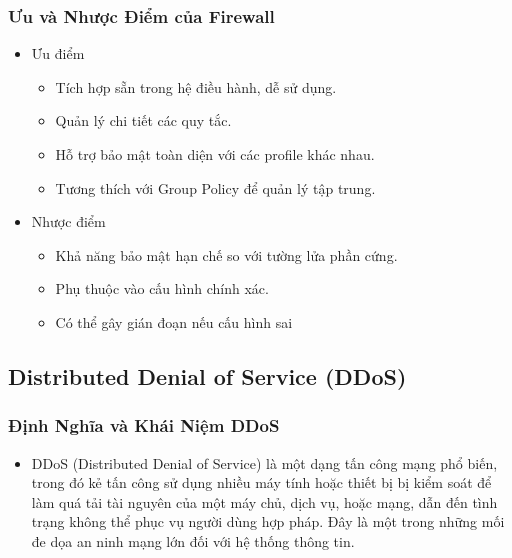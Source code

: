 \documentclass[13pt]{article}
\begin{document}
                \subsubsection{Ưu và Nhược Điểm của Firewall}
                \begin{itemize}
                    \item Ưu điểm
                    \begin{itemize}
                        \item Tích hợp sẵn trong hệ điều hành, dễ sử dụng.
                        \item Quản lý chi tiết các quy tắc.
                        \item Hỗ trợ bảo mật toàn diện với các profile khác nhau.
                        \item Tương thích với Group Policy để quản lý tập trung.
                        
                    \end{itemize}
    
                    \item Nhược điểm
                    \begin{itemize}
                        \item Khả năng bảo mật hạn chế so với tường lửa phần cứng.
                        \item Phụ thuộc vào cấu hình chính xác.
                        \item Có thể gây gián đoạn nếu cấu hình sai
                        
                    \end{itemize}
                    \end{itemize}

            \subsection{Distributed Denial of Service (DDoS)}
                \subsubsection{Định Nghĩa và Khái Niệm DDoS  }
                \begin{itemize}
                \item DDoS (Distributed Denial of Service) là một dạng tấn công mạng phổ biến, trong đó kẻ tấn công sử dụng nhiều máy tính hoặc thiết bị bị kiểm soát để làm quá tải tài nguyên của một máy chủ, dịch vụ, hoặc mạng, dẫn đến tình trạng không thể phục vụ người dùng hợp pháp. Đây là một trong những mối đe dọa an ninh mạng lớn đối với hệ thống thông tin.
                \end{itemize}
\end{document}
